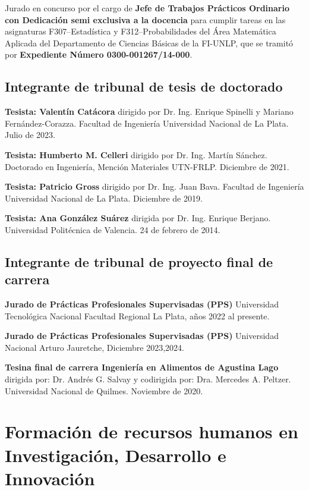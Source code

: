 \documentclass[margin,line]{res}
\begin{document}
\begin{resume}
Jurado en concurso por el cargo de {\bf Jefe de Trabajos Prácticos Ordinario con Dedicación semi exclusiva  a la docencia} para cumplir tareas en las asignaturas F307--Estadística y F312--Probabilidades del Área Matemática Aplicada del Departamento de Ciencias Básicas de la FI-UNLP, que se tramitó por {\bf Expediente Número 0300-001267/14-000}.


 \subsection{ Integrante de tribunal de tesis de doctorado}

{\bf Tesista: Valentín Catácora} dirigido por Dr. Ing. Enrique Spinelli y Mariano Fernández-Corazza. Facultad de Ingeniería Universidad Nacional de La Plata. Julio de 2023.

{\bf Tesista: Humberto M. Celleri} dirigido por Dr. Ing. Martín Sánchez. Doctorado en Ingeniería, Mención Materiales UTN-FRLP. Diciembre de 2021. 

{\bf Tesista: Patricio Gross} dirigido por Dr. Ing. Juan Bava. Facultad de Ingeniería Universidad Nacional de La Plata. Diciembre de 2019. 
 
{\bf Tesista: Ana González Suárez} dirigida por Dr. Ing. Enrique Berjano. Universidad Politécnica de Valencia. 24 de febrero de 2014.

\subsection{ Integrante de tribunal de proyecto final de carrera}

{\bf Jurado de Prácticas Profesionales Supervisadas (PPS)} Universidad Tecnológica Nacional Facultad Regional La Plata, años 2022 al presente.

{\bf Jurado de Prácticas Profesionales Supervisadas (PPS)} Universidad Nacional Arturo Jauretche, Diciembre 2023,2024.

{\bf Tesina final de carrera Ingeniería en Alimentos de Agustina Lago} dirigida por: Dr. Andrés G. Salvay y codirigida por: Dra. Mercedes A. Peltzer. Universidad Nacional de Quilmes. Noviembre de 2020.
%

\section{ Formación de recursos humanos en Investigación, Desarrollo e Innovación}
\vspace*{-.2in}

\end{resume}
\end{document}
